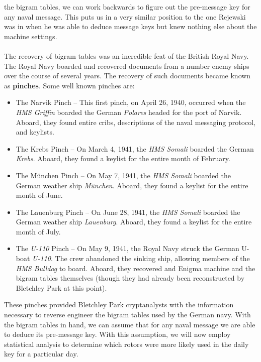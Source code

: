   the bigram tables, we can work backwards to figure out the
  pre-message key for any naval message. This puts us in a very
  similar position to the one Rejewski was in when he was able to
  deduce message keys but knew nothing else about the machine settings.
  \\\\The recovery of bigram tables was an incredible feat of the British Royal Navy. The Royal Navy boarded and recovered documents from a number enemy ships over the course of several years. The recovery of such documents became known as {\bf{pinches}}. Some well known pinches are: 
  \begin{itemize}
      \item The Narvik Pinch -- This first pinch, on April 26, 1940, occurred when the \emph{HMS Griffin} boarded the German \emph{Polares} headed for the port of Narvik. Aboard, they found entire cribs, descriptions of the naval messaging protocol, and keylists. 
      \item The Krebs Pinch -- On March 4, 1941, the \emph{HMS Somali} boarded the German \emph{Krebs}. Aboard, they found a keylist for the entire month of February. 
      \item The München Pinch -- On May 7, 1941, the \emph{HMS Somali} boarded the German weather ship \emph{München}. Aboard, they found a keylist for the entire month of June.
      \item The Lauenburg Pinch -- On June 28, 1941, the \emph{HMS Somali} boarded the German weather ship \emph{Lauenburg}. Aboard, they found a keylist for the entire month of July.
       \item The \emph{U-110} Pinch -- On May 9, 1941, the Royal Navy struck the German U-boat \emph{U-110}. The crew abandoned the sinking ship, allowing members of the \emph{HMS Bulldog} to board. Aboard, they recovered and Enigma machine and the bigram tables themselves (though they had already been reconstructed by Bletchley Park at this point). 
  \end{itemize}
  \noindent These pinches provided Bletchley Park cryptanalysts with the information necessary to reverse engineer the bigram tables used by the German navy. With the bigram tables in hand, we can assume that for any
  naval message we are able to deduce its pre-message key. With this
  assumption, we will now employ statistical analysis to determine
  which rotors were more likely used in the daily key for a particular day.

